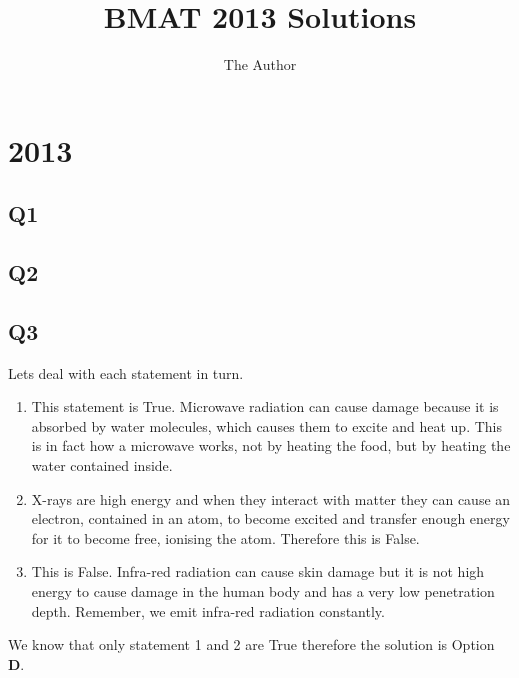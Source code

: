\documentclass[11pt]{article}
\title{BMAT 2013 Solutions}
\author{The Author}
\date{}                                           %
\begin{document}
\maketitle

\section{2013}
\subsection*{Q1}
\subsection*{Q2}
\subsection*{Q3}

Lets deal with each statement in turn.

\begin{enumerate}
\item This statement is True.  Microwave radiation can cause damage because it is absorbed by water molecules, which causes them to excite and heat up.  This is in fact how a microwave works, not by heating the food, but by heating the water contained inside.
\item X-rays are high energy and when they interact with matter they can cause an electron, contained in an atom, to become excited and transfer enough energy for it to become free, ionising the atom.  Therefore this is False.
\item This is False.  Infra-red radiation can cause skin damage but it is not high energy to cause damage in the human body and has a very low penetration depth.  Remember, we emit infra-red radiation constantly.
\end{enumerate}

We know that only statement 1 and 2 are True therefore the solution is Option \textbf{D}.
\end{document}
